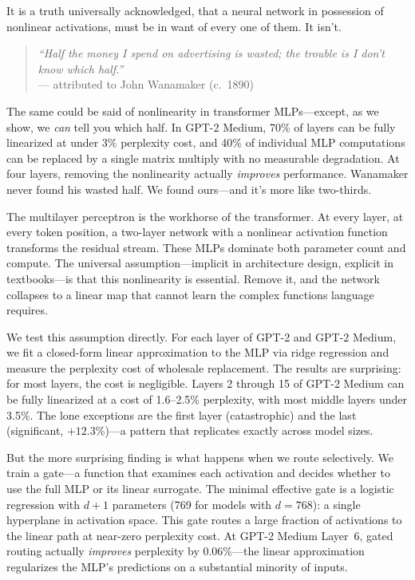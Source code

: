 \documentclass[11pt]{article}
\begin{document}
It is a truth universally acknowledged, that a neural network in possession of nonlinear activations, must be in want of every one of them. It isn't.

\begin{quote}
\textit{``Half the money I spend on advertising is wasted; the trouble is I don't know which half.''}\\
\hfill--- attributed to John Wanamaker (c.~1890)
\end{quote}

\noindent The same could be said of nonlinearity in transformer MLPs---except, as we show, we \textit{can} tell you which half. In GPT-2 Medium, 70\% of layers can be fully linearized at under 3\% perplexity cost, and 40\% of individual MLP computations can be replaced by a single matrix multiply with no measurable degradation. At four layers, removing the nonlinearity actually \textit{improves} performance. Wanamaker never found his wasted half. We found ours---and it's more like two-thirds.

The multilayer perceptron is the workhorse of the transformer. At every layer, at every token position, a two-layer network with a nonlinear activation function transforms the residual stream. These MLPs dominate both parameter count and compute. The universal assumption---implicit in architecture design, explicit in textbooks---is that this nonlinearity is essential. Remove it, and the network collapses to a linear map that cannot learn the complex functions language requires.

We test this assumption directly. For each layer of GPT-2 and GPT-2 Medium, we fit a closed-form linear approximation to the MLP via ridge regression and measure the perplexity cost of wholesale replacement. The results are surprising: for most layers, the cost is negligible. Layers 2 through 15 of GPT-2 Medium can be fully linearized at a cost of 1.6--2.5\% perplexity, with most middle layers under 3.5\%. The lone exceptions are the first layer (catastrophic) and the last (significant, $+12.3$\%)---a pattern that replicates exactly across model sizes.

But the more surprising finding is what happens when we route selectively. We train a gate---a function that examines each activation and decides whether to use the full MLP or its linear surrogate. The minimal effective gate is a logistic regression with $d{+}1$ parameters (769 for models with $d=768$): a single hyperplane in activation space. This gate routes a large fraction of activations to the linear path at near-zero perplexity cost. At GPT-2 Medium Layer~6, gated routing actually \textit{improves} perplexity by 0.06\%---the linear approximation regularizes the MLP's predictions on a substantial minority of inputs.
\end{document}
